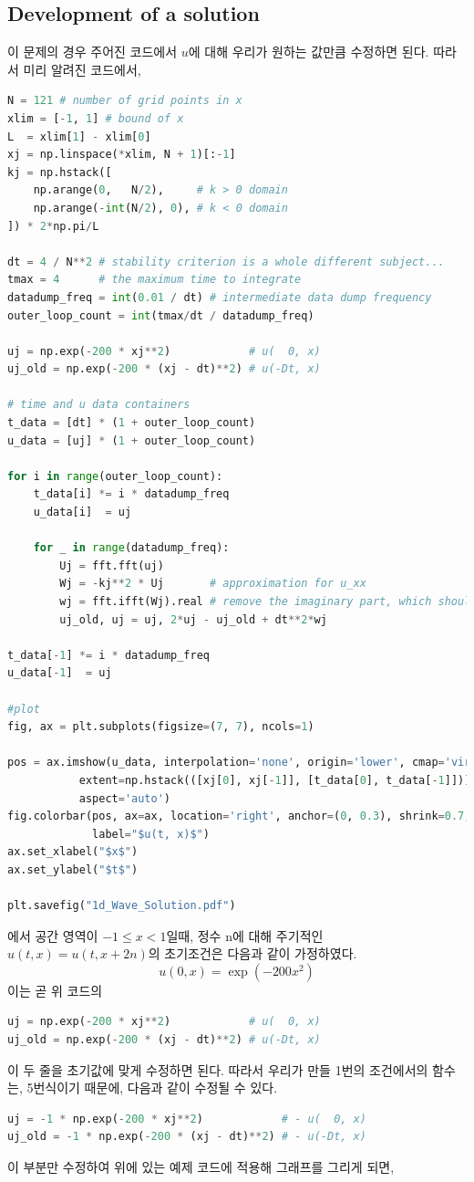 \documentclass[11pt]{article}
\begin{document}
\subsection{Development of a solution} 
이 문제의 경우 주어진 코드에서 $u$에 대해 우리가 원하는 값만큼 수정하면 된다. 따라서 미리 알려진 코드에서,

\begin{lstlisting}[language=Python]
N = 121 # number of grid points in x
xlim = [-1, 1] # bound of x
L  = xlim[1] - xlim[0]
xj = np.linspace(*xlim, N + 1)[:-1]
kj = np.hstack([
    np.arange(0,   N/2),     # k > 0 domain
    np.arange(-int(N/2), 0), # k < 0 domain
]) * 2*np.pi/L

dt = 4 / N**2 # stability criterion is a whole different subject...
tmax = 4      # the maximum time to integrate
datadump_freq = int(0.01 / dt) # intermediate data dump frequency
outer_loop_count = int(tmax/dt / datadump_freq)

uj = np.exp(-200 * xj**2)            # u(  0, x)
uj_old = np.exp(-200 * (xj - dt)**2) # u(-Dt, x)

# time and u data containers
t_data = [dt] * (1 + outer_loop_count)
u_data = [uj] * (1 + outer_loop_count)

for i in range(outer_loop_count):
    t_data[i] *= i * datadump_freq
    u_data[i]  = uj

    for _ in range(datadump_freq):
        Uj = fft.fft(uj)
        Wj = -kj**2 * Uj       # approximation for u_xx
        wj = fft.ifft(Wj).real # remove the imaginary part, which should all be zeros
        uj_old, uj = uj, 2*uj - uj_old + dt**2*wj

t_data[-1] *= i * datadump_freq
u_data[-1]  = uj

#plot
fig, ax = plt.subplots(figsize=(7, 7), ncols=1)

pos = ax.imshow(u_data, interpolation='none', origin='lower', cmap='viridis',
           extent=np.hstack(([xj[0], xj[-1]], [t_data[0], t_data[-1]])),
           aspect='auto')
fig.colorbar(pos, ax=ax, location='right', anchor=(0, 0.3), shrink=0.7,
             label="$u(t, x)$")
ax.set_xlabel("$x$")
ax.set_ylabel("$t$")

plt.savefig("1d_Wave_Solution.pdf")
\end{lstlisting}
에서 공간 영역이 $-1 \le x < 1$일때, 정수 n에 대해 주기적인 $u(t, x) = u(t, x + 2n)$의 초기조건은 다음과 같이 가정하였다.
\begin{equation}
u(0, x) = \exp(-200 x^2)
\end{equation}
이는 곧 위 코드의 
\begin{lstlisting}[language=Python]
uj = np.exp(-200 * xj**2)            # u(  0, x)
uj_old = np.exp(-200 * (xj - dt)**2) # u(-Dt, x)
\end{lstlisting}
이 두 줄을 초기값에 맞게 수정하면 된다. 따라서 우리가 만들 1번의 조건에서의 함수는, 5번식이기 때문에, 다음과 같이 수정될 수 있다.
\begin{lstlisting}[language=Python]
uj = -1 * np.exp(-200 * xj**2)            # - u(  0, x)
uj_old = -1 * np.exp(-200 * (xj - dt)**2) # - u(-Dt, x)
\end{lstlisting}
이 부분만 수정하여 위에 있는 예제 코드에 적용해 그래프를 그리게 되면,
\end{document}
